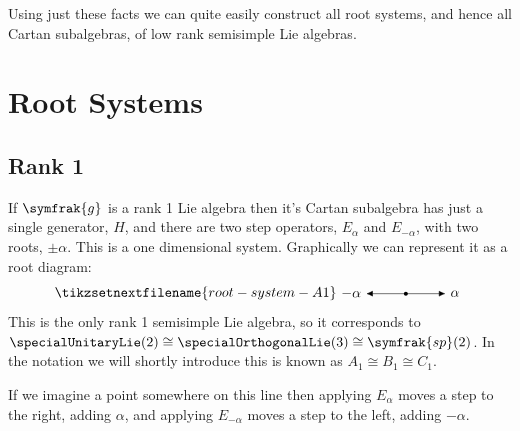 \documentclass[fleqn]{NotesClass}
\renewcommand{\lie}[1]{\symfrak{#1}}
\newcommand{\isomorphic}{\cong}
\newcommand{\symplecticLie}{\lie{sp}}
\begin{document}
    Using just these facts we can quite easily construct all root systems, and hence all Cartan subalgebras, of low rank semisimple Lie algebras.
    
    \section{Root Systems}
    \subsection{Rank 1}
    If \(\lie{g}\) is a rank 1 Lie algebra then it's Cartan subalgebra has just a single generator, \(H\), and there are two step operators, \(E_\alpha\) and \(E_{-\alpha}\), with two roots, \(\pm \alpha\).
    This is a one dimensional system.
    Graphically we can represent it as a root diagram:
    \begin{equation}
        \tikzsetnextfilename{root-system-A1}
        \begin{tikzpicture}[
            baseline = (alpha.base),
            >={Latex[width=1.5mm]}
            ]
            \draw[->] (0, 0) -- (1, 0) node (alpha) [right] {\(\alpha\)};
            \draw[->] (0, 0) -- (-1, 0) node [left] {\(-\alpha\)};
            \fill (0, 0) circle [radius = 0.05];
        \end{tikzpicture}
    \end{equation}
    This is the only rank 1 semisimple Lie algebra, so it corresponds to \(\specialUnitaryLie(2) \isomorphic \specialOrthogonalLie(3) \isomorphic \symplecticLie(2)\).
    In the notation we will shortly introduce this is known as \(A_1 \isomorphic B_1 \isomorphic C_1\).
    
    If we imagine a point somewhere on this line then applying \(E_\alpha\) moves a step to the right, adding \(\alpha\), and applying \(E_{-\alpha}\) moves a step to the left, adding \(-\alpha\).
    
\end{document}
